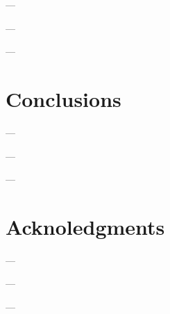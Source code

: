 \documentclass[lettersize,journal]{IEEEtran}
\begin{document}
---

---

---




\section{Conclusions} \label{s:Conclusions}

---

---

---




\section{Acknoledgments} \label{s:Acknoledgments}

---

---

---




\printbibliography
\end{document}
